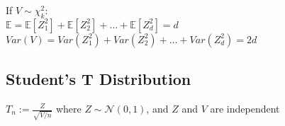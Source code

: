 If $V \sim \chi^2_k:$\\

$\mathbb{E}= \mathbb{E}[Z_1^2] + \mathbb{E}[Z_2^2] + \ldots + \mathbb{E}[Z_d^2] = d$\\ 

$Var(V) = Var(Z_1^2) + Var(Z_2^2) + \ldots + Var(Z_d^2) = 2d$

\subsection*{Student's T Distribution}

$T_ n := \frac{Z}{\sqrt{V/n}}$ where $Z \sim \mathcal{N}(0,1)$, and $Z$ and $V$ are independent